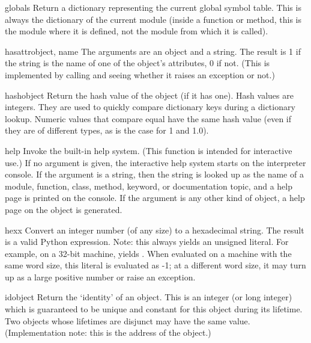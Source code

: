 \begin{funcdesc}{globals}{}
  Return a dictionary representing the current global symbol table.
  This is always the dictionary of the current module (inside a
  function or method, this is the module where it is defined, not the
  module from which it is called).
\end{funcdesc}

\begin{funcdesc}{hasattr}{object, name}
  The arguments are an object and a string.  The result is 1 if the
  string is the name of one of the object's attributes, 0 if not.
  (This is implemented by calling  and seeing whether it raises an exception or not.)
\end{funcdesc}

\begin{funcdesc}{hash}{object}
  Return the hash value of the object (if it has one).  Hash values
  are integers.  They are used to quickly compare dictionary
  keys during a dictionary lookup.  Numeric values that compare equal
  have the same hash value (even if they are of different types, as is
  the case for 1 and 1.0).
\end{funcdesc}

\begin{funcdesc}{help}{}
  Invoke the built-in help system.  (This function is intended for
  interactive use.)  If no argument is given, the interactive help
  system starts on the interpreter console.  If the argument is a
  string, then the string is looked up as the name of a module,
  function, class, method, keyword, or documentation topic, and a
  help page is printed on the console.  If the argument is any other
  kind of object, a help page on the object is generated.
\end{funcdesc}

\begin{funcdesc}{hex}{x}
  Convert an integer number (of any size) to a hexadecimal string.
  The result is a valid Python expression.  Note: this always yields
  an unsigned literal.  For example, on a 32-bit machine,
   yields .  When evaluated on a
  machine with the same word size, this literal is evaluated as -1; at
  a different word size, it may turn up as a large positive number or
  raise an  exception.
\end{funcdesc}

\begin{funcdesc}{id}{object}
  Return the `identity' of an object.  This is an integer (or long
  integer) which is guaranteed to be unique and constant for this
  object during its lifetime.  Two objects whose lifetimes are
  disjunct may have the same  value.  (Implementation
  note: this is the address of the object.)
\end{funcdesc}


